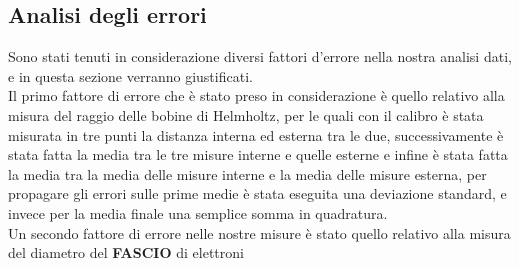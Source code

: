 \subsection{Analisi degli errori}
    Sono stati tenuti in considerazione diversi fattori d'errore nella nostra analisi dati, e in questa sezione verranno giustificati.\\
    Il primo fattore di errore che è stato preso in considerazione è quello relativo alla misura del raggio delle bobine di Helmholtz, per le quali con il calibro 
    è stata misurata in tre punti la distanza interna ed esterna tra le due, successivamente è stata fatta la media tra le tre misure interne e quelle esterne e infine è stata 
    fatta la media tra la media delle misure interne e la media delle misure esterna, per propagare gli errori sulle prime medie è stata eseguita una deviazione standard, 
    e invece per la media finale una semplice somma in quadratura.\\
    Un secondo fattore di errore nelle nostre misure è stato quello relativo alla misura del diametro del \textbf{FASCIO} di elettroni 